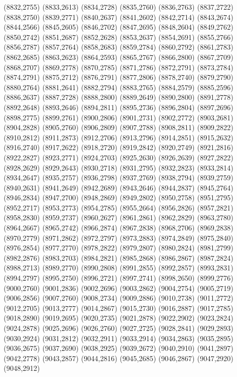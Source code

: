 (8832,2755)
(8833,2613)
(8834,2728)
(8835,2760)
(8836,2763)
(8837,2722)
(8838,2750)
(8839,2771)
(8840,2637)
(8841,2602)
(8842,2714)
(8843,2674)
(8844,2566)
(8845,2605)
(8846,2702)
(8847,2695)
(8848,2604)
(8849,2762)
(8850,2742)
(8851,2687)
(8852,2628)
(8853,2637)
(8854,2691)
(8855,2766)
(8856,2787)
(8857,2764)
(8858,2683)
(8859,2784)
(8860,2792)
(8861,2783)
(8862,2685)
(8863,2623)
(8864,2593)
(8865,2767)
(8866,2800)
(8867,2709)
(8868,2707)
(8869,2778)
(8870,2785)
(8871,2786)
(8872,2791)
(8873,2784)
(8874,2791)
(8875,2712)
(8876,2791)
(8877,2806)
(8878,2740)
(8879,2790)
(8880,2764)
(8881,2641)
(8882,2794)
(8883,2765)
(8884,2579)
(8885,2596)
(8886,2637)
(8887,2728)
(8888,2800)
(8889,2649)
(8890,2800)
(8891,2778)
(8892,2648)
(8893,2646)
(8894,2811)
(8895,2736)
(8896,2804)
(8897,2696)
(8898,2775)
(8899,2761)
(8900,2806)
(8901,2731)
(8902,2772)
(8903,2681)
(8904,2828)
(8905,2760)
(8906,2809)
(8907,2788)
(8908,2811)
(8909,2822)
(8910,2812)
(8911,2873)
(8912,2706)
(8913,2796)
(8914,2851)
(8915,2632)
(8916,2740)
(8917,2622)
(8918,2720)
(8919,2842)
(8920,2749)
(8921,2816)
(8922,2827)
(8923,2771)
(8924,2703)
(8925,2630)
(8926,2639)
(8927,2822)
(8928,2629)
(8929,2643)
(8930,2718)
(8931,2795)
(8932,2823)
(8933,2814)
(8934,2647)
(8935,2757)
(8936,2798)
(8937,2769)
(8938,2794)
(8939,2759)
(8940,2631)
(8941,2649)
(8942,2689)
(8943,2646)
(8944,2837)
(8945,2764)
(8946,2834)
(8947,2700)
(8948,2869)
(8949,2802)
(8950,2758)
(8951,2795)
(8952,2717)
(8953,2773)
(8954,2785)
(8955,2664)
(8956,2826)
(8957,2821)
(8958,2830)
(8959,2737)
(8960,2627)
(8961,2861)
(8962,2829)
(8963,2780)
(8964,2667)
(8965,2742)
(8966,2874)
(8967,2838)
(8968,2706)
(8969,2838)
(8970,2779)
(8971,2862)
(8972,2797)
(8973,2883)
(8974,2849)
(8975,2840)
(8976,2854)
(8977,2770)
(8978,2822)
(8979,2807)
(8980,2824)
(8981,2799)
(8982,2876)
(8983,2703)
(8984,2821)
(8985,2868)
(8986,2867)
(8987,2824)
(8988,2713)
(8989,2770)
(8990,2808)
(8991,2855)
(8992,2857)
(8993,2831)
(8994,2797)
(8995,2750)
(8996,2721)
(8997,2741)
(8998,2650)
(8999,2776)
(9000,2760)
(9001,2836)
(9002,2696)
(9003,2862)
(9004,2754)
(9005,2719)
(9006,2856)
(9007,2760)
(9008,2734)
(9009,2886)
(9010,2738)
(9011,2772)
(9012,2705)
(9013,2777)
(9014,2867)
(9015,2730)
(9016,2887)
(9017,2785)
(9018,2890)
(9019,2695)
(9020,2735)
(9021,2878)
(9022,2902)
(9023,2824)
(9024,2878)
(9025,2696)
(9026,2760)
(9027,2725)
(9028,2841)
(9029,2893)
(9030,2924)
(9031,2812)
(9032,2911)
(9033,2914)
(9034,2863)
(9035,2895)
(9036,2675)
(9037,2690)
(9038,2925)
(9039,2672)
(9040,2910)
(9041,2897)
(9042,2778)
(9043,2857)
(9044,2816)
(9045,2685)
(9046,2867)
(9047,2920)
(9048,2912)
